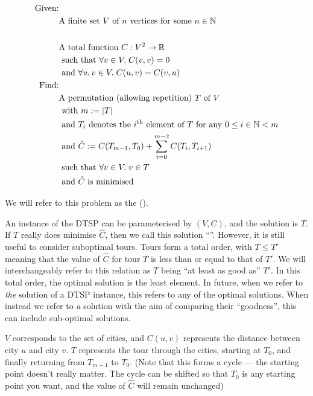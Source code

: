 \begin{align*}
  \textrm{Given:} & \\
  &\textrm{A finite set }V\textrm{ of }n\textrm{ vertices for some }n\in\mathbb{N} \\ \\
  &\textrm{A total function }C : V^2\rightarrow\mathbb{R} \\
  &\textrm{ such that }\forall v \in V.\; C(v,v)=0 \\
  &\textrm{ and }\forall u,v \in V.\; C(u,v)=C(v,u) \\
  \textrm{Find:} & \\
  &\textrm{A permutation (allowing repetition) }T\textrm{ of }V \\
  &\textrm{ with }m:=\left|T\right| \\
  &\textrm{ and }T_i\textrm{ denotes the }i\textrm{\textsuperscript{th} element of }T\textrm{ for any }0\leq i\in \mathbb{N}<m \\
  &\textrm{ and }\hat{C}:=C(T_{m-1},T_0)+\sum_{i=0}^{m-2}C(T_i,T_{i+1}) \\
  &\textrm{ such that }\forall v\in V.\; v\in T \\
  &\textrm{ and }\hat{C}\textrm{ is minimised }
\end{align*}

We will refer to this problem as the  ().

An instance of the DTSP can be parameterised by $(V,C)$, and the solution is $T$. If $T$ really does minimise $\hat{C}$, then we call this solution ``''. However, it is still useful to consider suboptimal tours. Tours form a total order, with $T\leq T'$ meaning that the value of $\hat{C}$ for tour $T$ is less than or equal to that of $T'$. We will interchangeably refer to this relation as $T$ being ``at least as good as'' $T'$. In this total order, the optimal solution is the least element. In future, when we refer to \textit{the} solution of a DTSP instance, this refers to any of the optimal solutions. When instead we refer to \textit{a} solution with the aim of comparing their ``goodness'', this can include sub-optimal solutions.

$V$ corresponds to the set of cities, and $C(u,v)$ represents the distance between city $u$ and city $v$. $T$ represents the tour through the cities, starting at $T_0$, and finally returning from $T_{m-1}$ to $T_0$. (Note that this forms a cycle --- the starting point doesn't really matter. The cycle can be shifted so that $T_0$ is any starting point you want, and the value of $\hat{C}$ will remain unchanged)

